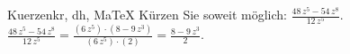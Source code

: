 \begin{MAufgabe}{Kuerzen}{kr, dh, MaTeX}
K\"urzen Sie soweit m\"oglich: $\frac{48\, z^5 - 54\, z^8}{12\, z^5}$.\\ 
\ifLsg\MLoesung
\quad $\frac{48\, z^5 - 54\, z^8}{12\, z^5}=\frac{(6\, z^5)\cdot(8 - 9\, z^3)}{(6\, z^5)\cdot(2)}=\frac{8 - 9\, z^3}{2}$.\else\relax\fi
 \end{MAufgabe}